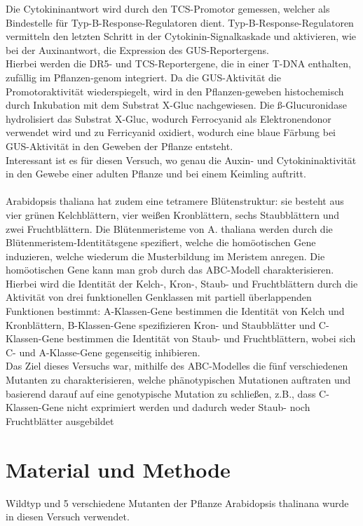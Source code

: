 \documentclass[10pt,a4paper]{article}
\begin{document}
	Die Cytokininantwort wird durch den TCS-Promotor gemessen, welcher als Bindestelle für Typ-B-Response-Regulatoren dient. Typ-B-Response-Regulatoren vermitteln den letzten Schritt in der Cytokinin-Signalkaskade und aktivieren, wie bei der Auxinantwort, die Expression des GUS-Reportergens. \\
	Hierbei werden die DR5- und TCS-Reportergene, die in einer T-DNA enthalten, zufällig im Pflanzen-genom integriert. Da die GUS-Aktivität die Promotoraktivität wiederspiegelt, wird in den Pflanzen-geweben histochemisch durch Inkubation mit dem Substrat X-Gluc nachgewiesen. Die ß-Glucuronidase hydrolisiert das Substrat X-Gluc, wodurch Ferrocyanid als Elektronendonor verwendet wird und zu Ferricyanid oxidiert, wodurch eine blaue Färbung bei GUS-Aktivität in den Geweben der Pflanze entsteht. \\
	Interessant ist es für diesen Versuch, wo genau die Auxin- und Cytokininaktivität in den Gewebe einer adulten Pflanze und bei einem Keimling auftritt.\\
	\\
	Arabidopsis thaliana hat zudem eine tetramere Blütenstruktur: sie besteht aus vier grünen Kelchblättern, vier weißen Kronblättern, sechs Staubblättern und zwei Fruchtblättern. Die Blütenmeristeme von A. thaliana werden durch die Blütenmeristem-Identitätsgene spezifiert, welche die homöotischen Gene induzieren, welche wiederum die Musterbildung im Meristem anregen. Die homöotischen Gene kann man grob durch das ABC-Modell charakterisieren. Hierbei wird die Identität der Kelch-, Kron-, Staub- und Fruchtblättern durch die Aktivität von drei funktionellen Genklassen mit partiell überlappenden Funktionen bestimmt: A-Klassen-Gene bestimmen die Identität von Kelch und Kronblättern, B-Klassen-Gene spezifizieren Kron- und Staubblätter und C-Klassen-Gene bestimmen die Identität von Staub- und Fruchtblättern, wobei sich C- und A-Klasse-Gene gegenseitig inhibieren. \\
	Das Ziel dieses Versuchs war, mithilfe des ABC-Modelles die fünf verschiedenen Mutanten zu charakterisieren, welche phänotypischen Mutationen auftraten und basierend darauf auf eine genotypische Mutation zu schließen, z.B., dass C-Klassen-Gene nicht exprimiert werden und dadurch weder Staub- noch Fruchtblätter ausgebildet 
	
	
	
	\section{Material und Methode}
	Wildtyp und 5 verschiedene Mutanten der Pflanze Arabidopsis thalinana wurde in diesen Versuch verwendet.
\end{document}
